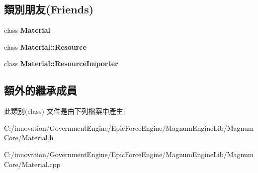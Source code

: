 \subsection*{類別朋友(Friends)}
\begin{DoxyCompactItemize}
\item 
class {\bfseries Material}\hypertarget{class_i_dream_sky_1_1_material_1_1_resource_aa1212b6e372a0f45d2c01f3cd203af77}{}\label{class_i_dream_sky_1_1_material_1_1_resource_aa1212b6e372a0f45d2c01f3cd203af77}

\item 
class {\bfseries Material\+::\+Resource}\hypertarget{class_i_dream_sky_1_1_material_1_1_resource_a6a002bcee6c883089769545352e9ccbd}{}\label{class_i_dream_sky_1_1_material_1_1_resource_a6a002bcee6c883089769545352e9ccbd}

\item 
class {\bfseries Material\+::\+Resource\+Importer}\hypertarget{class_i_dream_sky_1_1_material_1_1_resource_a941a71e735085112a8496c27836506ee}{}\label{class_i_dream_sky_1_1_material_1_1_resource_a941a71e735085112a8496c27836506ee}

\end{DoxyCompactItemize}
\subsection*{額外的繼承成員}


此類別(class) 文件是由下列檔案中產生\+:\begin{DoxyCompactItemize}
\item 
C\+:/innovation/\+Government\+Engine/\+Epic\+Force\+Engine/\+Magnum\+Engine\+Lib/\+Magnum\+Core/Material.\+h\item 
C\+:/innovation/\+Government\+Engine/\+Epic\+Force\+Engine/\+Magnum\+Engine\+Lib/\+Magnum\+Core/Material.\+cpp\end{DoxyCompactItemize}
